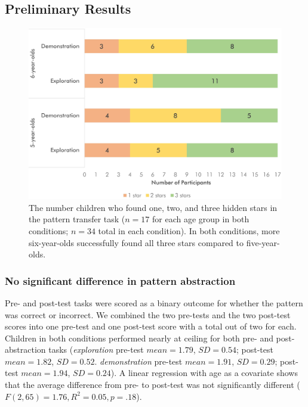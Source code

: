 \subsection{Preliminary Results}

\begin{figure}
\centering
  \includegraphics[width=.8\textwidth]{future/figures/pattern_stars.jpg}
  \caption{The number children who found one, two, and three hidden stars in the pattern transfer task ($n=17$ for each age group in both conditions; $n=34$ total in each condition). In both conditions, more six-year-olds successfully found all three stars compared to five-year-olds.
}
  \label{fig:pattern-stars}
\end{figure}

\subsubsection{No significant difference in pattern abstraction}
Pre- and post-test tasks were scored as a binary outcome for whether the pattern was correct or incorrect. We combined the two pre-tests and the two post-test scores into one pre-test and one post-test score with a total out of two for each. Children in both conditions performed nearly at ceiling for both pre- and post-abstraction tasks (\textit{exploration} pre-test $mean=1.79$, $SD=0.54$; post-test $mean=1.82$, $SD=0.52$. \textit{demonstration} pre-test $mean=1.91$, $SD=0.29$; post-test $mean=1.94$, $SD=0.24$). A linear regression with age as a covariate shows that the average difference from pre- to post-test was not significantly different ($F(2,65)=1.76, R^2=0.05, p=.18$).

